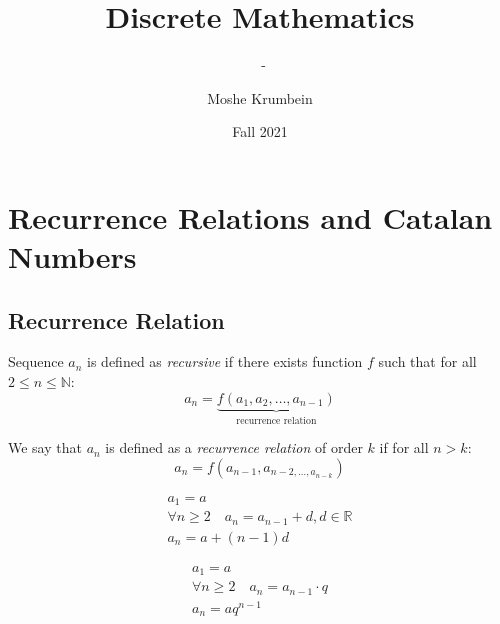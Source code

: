 \documentclass[00_complete]{subfiles}
\title{Discrete Mathematics}
\author{Moshe Krumbein}
\date{Fall 2021}
\begin{document}
\setcounter{chapter}{8}

\chapter{Recurrence Relations and Catalan Numbers}
\subtitle{\theauthor~- \thedate}

\section{Recurrence Relation}
\begin{definition}[Recursion]
    Sequence $a_n$ is defined as \emph{recursive} if there exists function $f$
    such that for all $2 \leq n \leq \mathbb{N}$:
    $$a_n=\underbrace{f(a_1,a_2,\dots, a_{n-1})}_{\text{recurrence relation}}$$
\end{definition}
\begin{definition}
    We say that $a_n$ is defined as a \emph{recurrence relation} of order $k$
    if for all $n>k$:
    $$a_n=f(a_{n-1},a_{n-2,\dots,a_{n-k}})$$
\end{definition}
\begin{example}
$$
\begin{gathered}
    a_1=a \\
    \forall n \geq 2 \quad a_n = a_{n-1}+d,d \in \mathbb{R} \\
    a_n = a+ (n-1)d
\end{gathered}
$$
\end{example}
\begin{example}
$$
\begin{gathered}
    a_1=a \\
    \forall n \geq 2 \quad a_n = a_{n-1} \cdot q \\
    a_n = aq^{n-1}
\end{gathered}
$$
\end{example}
\end{document}
